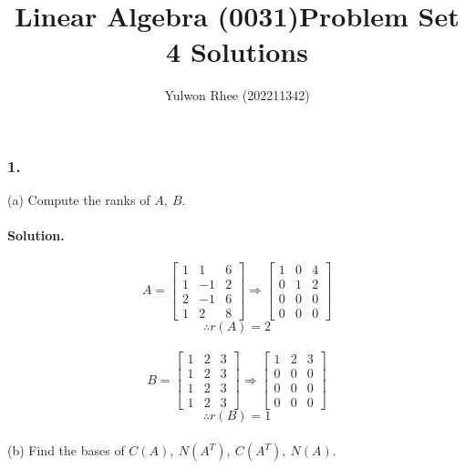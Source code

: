 



\title{Linear Algebra (0031)\newline\space Problem Set 4 Solutions}
\author{Yulwon Rhee (202211342)}

\maketitle
\subsubsection{1.}
(a) Compute the ranks of $A,\ B$.
\paragraph*{Solution.}
$$A=\begin{bmatrix}
    1&1&6\\
    1&-1&2\\
    2&-1&6\\
    1&2&8
\end{bmatrix}\Rightarrow\begin{bmatrix}
    1&0&4\\
    0&1&2\\
    0&0&0\\
    0&0&0
\end{bmatrix}$$
$$\therefore r(A) = 2$$\\
$$B=\begin{bmatrix}
    1&2&3\\
    1&2&3\\
    1&2&3\\
    1&2&3
\end{bmatrix}\Rightarrow\begin{bmatrix}
    1&2&3\\
    0&0&0\\
    0&0&0\\
    0&0&0
\end{bmatrix}$$
$$\therefore r(B) = 1$$\\

(b) Find the bases of $C(A),\ N(A^T),\ C(A^T),\ N(A)$.
